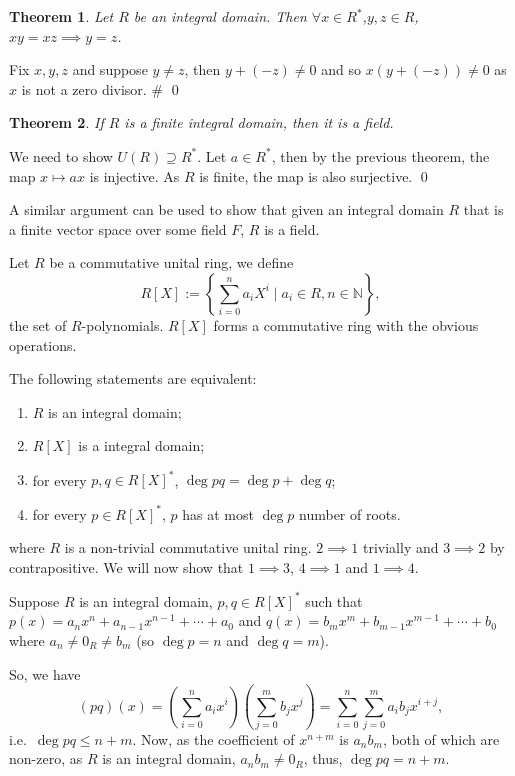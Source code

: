 \documentclass[
]{article}
\newtheorem{theorem}{Theorem}
\begin{document}
\begin{theorem}
  Let \(R\) be an integral domain. Then \(\forall x \in R^*\),\(y, z \in R\),
  \(xy = xz \implies y = z\).
\end{theorem}
\proof

Fix \(x, y, z\) and suppose \(y \neq z\), then \(y + (-z) \neq 0\) and
so \(x (y + (-z)) \neq 0\) as \(x\) is not a zero divisor. \# \qed

\begin{theorem}
  If \(R\) is a finite integral domain, then it is a field.
\end{theorem}
\proof

We need to show \(U(R) \supseteq R^*\). Let \(a \in R^*\), then by the
previous theorem, the map \(x \mapsto ax\) is injective. As \(R\) is
finite, the map is also surjective. \qed

A similar argument can be used to show that given an integral domain
\(R\) that is a finite vector space over some field \(F\), \(R\) is a
field.

Let \(R\) be a commutative unital ring, we define \[
  R[X] := \left\{ \sum_{i = 0}^n a_i X^i \mid a_i \in R, n \in \mathbb{N} \right\},
\] the set of \(R\)-polynomials. \(R[X]\) forms a commutative ring with
the obvious operations.

The following statements are equivalent:

\begin{enumerate} 
  \item \(R\) is an integral domain;
  \item \(R[X]\) is a integral domain;
  \item for every \(p, q \in R[X]^*\), \(\deg pq = \deg p + \deg q\);
  \item for every \(p \in R[X]^*\), \(p\) has at most \(\deg p\) number of roots.
\end{enumerate}

where \(R\) is a non-trivial commutative unital ring. \proof
\(2 \implies 1\) trivially and \(3 \implies 2\) by contrapositive. We
will now show that \(1 \implies 3\), \(4 \implies 1\) and
\(1 \implies 4\).

Suppose \(R\) is an integral domain, \(p, q \in R[X]^*\) such that
\(p(x) = a_n x^n + a_{n - 1} x^{n - 1} + \cdots + a_0\) and
\(q(x) = b_m x^m + b_{m - 1} x^{m - 1} + \cdots + b_0\) where
\(a_n \neq 0_R \neq b_m\) (so \(\deg p = n\) and \(\deg q = m\)).

So, we have \[(pq)(x) = \left(\sum_{i = 0}^n a_i x^i\right) 
              \left(\sum_{j = 0}^m b_j x^j\right)
            = \sum_{i = 0}^n \sum_{j = 0}^m a_i b_j x^{i + j},\]
i.e.~\(\deg pq \le n + m\). Now, as the coefficient of \(x^{n + m}\) is
\(a_n b_m\), both of which are non-zero, as \(R\) is an integral domain,
\(a_n b_m \neq 0_R\), thus, \(\deg pq = n + m\).
\end{document}
